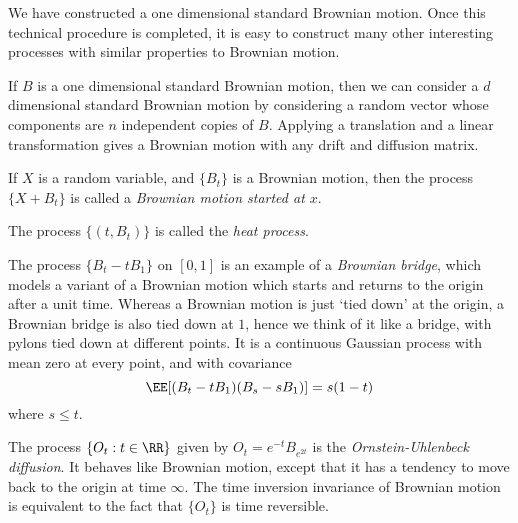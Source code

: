 We have constructed a one dimensional standard Brownian motion. Once this technical procedure is completed, it is easy to construct many other interesting processes with similar properties to Brownian motion.

\begin{example}
    If $B$ is a one dimensional standard Brownian motion, then we can consider a $d$ dimensional standard Brownian motion by considering a random vector whose components are $n$ independent copies of $B$. Applying a translation and a linear transformation gives a Brownian motion with any drift and diffusion matrix.
\end{example}

\begin{example}
    If $X$ is a random variable, and $\{ B_t \}$ is a Brownian motion, then the process $\{ X + B_t \}$ is called a \emph{Brownian motion started at $x$}.
\end{example}

\begin{example}
    The process $\{ (t,B_t) \}$ is called the \emph{heat process}.
\end{example}

\begin{example}
    The process $\{ B_t - t B_1 \}$ on $[0,1]$ is an example of a \emph{Brownian bridge}, which models a variant of a Brownian motion which starts and returns to the origin after a unit time. Whereas a Brownian motion is just `tied down' at the origin, a Brownian bridge is also tied down at $1$, hence we think of it like a bridge, with pylons tied down at different points. It is a continuous Gaussian process with mean zero at every point, and with covariance
    \[ \EE[(B_t - tB_1)(B_s - sB_1)] = s(1-t) \]
    where $s \leq t$.
\end{example}

\begin{example}
    The process $\{ O_t: t \in \RR \}$ given by $O_t = e^{-t} B_{e^{2t}}$ is the \emph{Ornstein-Uhlenbeck diffusion}. It behaves like Brownian motion, except that it has a tendency to move back to the origin at time $\infty$. The time inversion invariance of Brownian motion is equivalent to the fact that $\{ O_t \}$ is time reversible.
\end{example}

